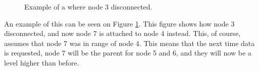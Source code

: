 \begin{figure}[!h]
	\centering
	\caption{Example of a where node 3 disconnected.}
	\label{fig:prottree2}
\end{figure}

An example of this can be seen on Figure \ref{fig:prottree2}. This figure shows how node 3 disconnected, and now node 7 is attached to node 4 instead. This, of course, assumes that node 7 was in range of node 4.
This means that the next time data is requested, node 7 will be the parent for node 5 and 6, and they will now be a level higher than before.


